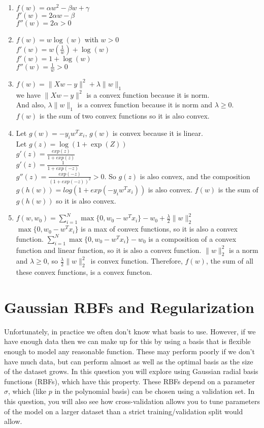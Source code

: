 \documentclass{article}
\def\norm#1{\|#1\|}
\def\enum#1{\begin{enumerate}#1\end{enumerate}}
\begin{document}
\enum{
\item $f(w) = \alpha w^2 - \beta w + \gamma$\\
         $f'(w) = 2\alpha w  - \beta $\\
          $f''(w) = 2\alpha   >0  $
\item $f(w) = w\log(w) $ with $w > 0$\\ 
       $f'(w) = w(\frac{1}{w})+ \log(w) $\\
       $f'(w) = 1+ \log(w) $ \\
       $f''(w) = \frac{1}{w}  >0 $
\item $f(w) = \norm{Xw-y}^2 + \lambda\norm{w}_1$ \\
        we have $ \norm{Xw-y}^2$ is a convex function because it is norm.\\
       And also, $\lambda\norm{w}_1$  is a convex function because it is norm and $\lambda \geq 0$.\\ $f(w)$ is the sum of two convex functions so it is also convex. 
\item Let $g(w) = -y_iw^Tx_i$, $g(w)$ is convex because it is linear.\\
      Let  $g(z) = \log(1+\exp(Z))$\\
        $g'(z) = \frac{exp(z)}{1+exp(z)}$\\
         $g'(z) = \frac{1}{1+exp(-z)}$\\
        $g''(z) =  \frac{exp(-z)}{(1+exp(-z))^2}   > 0 $. So $g(z)$ is also convex, and the composition $g(h(w)) = log(1+exp(-y_iw^Tx_i))$ is also convex. $f(w)$ is the sum of $g(h(w))$ so it is also convex.
\item $f(w,w_0) = \sum_{i=1}^N\max\{0,w_0 - w^Tx_i\} - w_0 + \frac{\lambda}{2}\norm{w}_2^2$\\
        $\max\{0,w_0 - w^Tx_i\} $ is a max of convex functions, so it is also a convex function. $\sum_{i=1}^N\max\{0,w_0 - w^Tx_i\} - w_0  $ is a composition of a convex function and linear function, so it is also a convex function. $\norm{w}_2^2$ is a norm and $\lambda \geq 0$, so $ \frac{\lambda}{2}\norm{w}_2^2$\ is convex function.
Therefore, $f(w)$, the sum of all these convex functions, is a convex functon.
}


\section{Gaussian RBFs and Regularization}

Unfortunately, in practice we often don't know what basis to use. However, if we have enough data then we can make up for this by using a basis that is flexible enough to model any reasonable function. These may perform poorly if we don't have much data, but can perform almost as well as the optimal basis as the size of the dataset grows. In this question you will explore using Gaussian radial basis functions (RBFs), which have this property. These RBFs depend on a parameter $\sigma$, which (like $p$ in the polynomial basis) can be chosen using a validation set. In this question, you will also see how cross-validation allows you to tune parameters of the model on a larger dataset than a strict training/validation split would allow.
\end{document}
